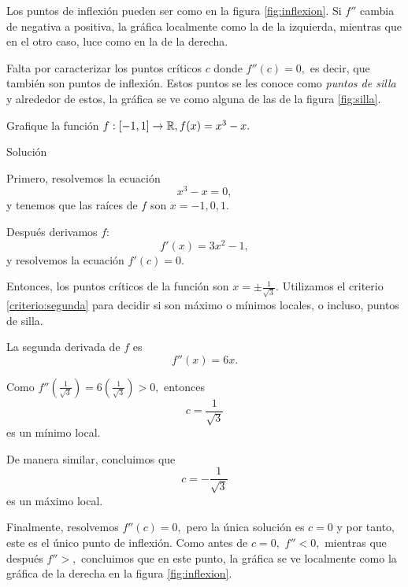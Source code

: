    Los puntos de inflexión pueden ser como en la figura \ref{fig:inflexion}. Si $f''$ cambia de negativa a positiva, la
    gráfica localmente como la de la izquierda, mientras que en el otro caso, luce como en la de la derecha.


    Falta por caracterizar los puntos críticos $c$ donde $f''(c)=0,$ es decir, que también son puntos de inflexión. Estos
    puntos se les conoce como \emph{puntos de silla} y alrededor de estos, la gráfica se ve como alguna de las de la figura
    \ref{fig:silla}.



    \begin{problema}
        \label{demo:grafica}
        Grafique la función $f:[-1,1]\to \mathbb{R}, f(x)=x^{3}-x.$
    \end{problema}


{Solución}
    
    Primero, resolvemos la ecuación
    $$
    x^3-x=0,
    $$
    y tenemos que las raíces de $f$ son $x=-1,0,1.$



    Después derivamos $f$:
    $$
    f'(x)=3x^{2}-1,
    $$
    y resolvemos la ecuación $f'(c)=0.$



    Entonces, los puntos críticos de la función son $x=\pm \frac{1}{\sqrt{3}}.$ Utilizamos el criterio
    \ref{criterio:segunda} para decidir si son máximo o mínimos locales, o incluso, puntos de silla.



    La segunda derivada de $f$ es
    $$
    f''(x)=6x.
    $$



    Como $f''(\frac{1}{\sqrt{3}})=6\left( \frac{1}{\sqrt{3}} \right)>0,$ entonces
    $$
    c=\dfrac{1}{\sqrt{3}}
    $$
    es un mínimo local.



    De manera similar, concluimos que
    $$
    c=-\dfrac{1}{\sqrt{3}}
    $$
    es un máximo local.



    Finalmente, resolvemos $f''(c)=0,$ pero la única solución es $c=0$ y por tanto, este es el único punto de inflexión.
    Como antes de $c=0,$ $f''<0,$ mientras que después $f''>,$ concluimos que en este punto, la gráfica se ve localmente
    como la gráfica de la derecha en la figura \ref{fig:inflexion}.




